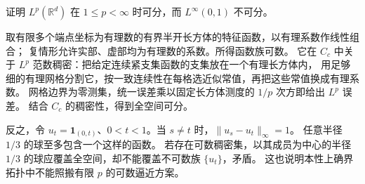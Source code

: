 \begin{exercise}\label{b1:ex:10-separability}
证明 \(L^p(\mathbb R^d)\) 在 \(1\leq p<\infty\) 时可分，而 \(L^\infty(0,1)\) 不可分。
\end{exercise}
\begin{solution}
取有限多个端点坐标为有理数的有界半开长方体的特征函数，以有理系数作线性组合；
复情形允许实部、虚部均为有理数的系数。所得函数族可数。
它在 \(C_c\) 中关于 \(L^p\) 范数稠密：把给定连续紧支集函数的支集放在一个有理长方体内，
用足够细的有理网格分割它，按一致连续性在每格选近似常值，再把这些常值换成有理系数。
网格边界为零测集，统一误差乘以固定长方体测度的 \(1/p\) 次方即给出 \(L^p\) 误差。
结合 \(C_c\) 的稠密性，得到全空间可分。

反之，令 \(u_t=\mathbf1_{(0,t)}\)、\(0<t<1\)。当 \(s\ne t\) 时，\(\|u_s-u_t\|_\infty=1\)。
任意半径 \(1/3\) 的球至多包含一个这样的函数。
若存在可数稠密集，以其成员为中心的半径 \(1/3\) 的球应覆盖全空间，却不能覆盖不可数族 \(\{u_t\}\)，矛盾。
这也说明本性上确界拓扑中不能照搬有限 \(p\) 的可数逼近方案。
\end{solution}
